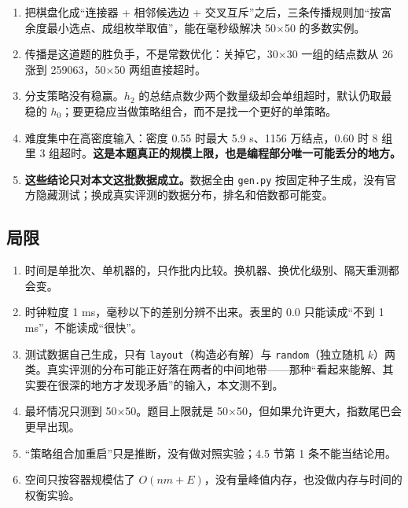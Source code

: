 \documentclass[12pt,a4paper,fontset=windows]{ctexart}
\newcommand{\code}[1]{\texttt{#1}}
\begin{document}
\begin{enumerate}[itemsep=3pt,topsep=2pt]
  \item 把棋盘化成“连接器 + 相邻候选边 + 交叉互斥”之后，三条传播规则加“按富余度最小选点、成组枚举取值”，能在毫秒级解决 50×50 的多数实例。
  \item 传播是这道题的胜负手，不是常数优化：关掉它，30×30 一组的结点数从 26 涨到 259063，50×50 两组直接超时。
  \item 分支策略没有稳赢。$h_2$ 的总结点数少两个数量级却会单组超时，默认仍取最稳的 $h_0$；要更稳应当做策略组合，而不是找一个更好的单策略。
  \item 难度集中在高密度输入：密度 0.55 时最大 5.9 s、1156 万结点，0.60 时 8 组里 3 组超时。\textbf{这是本题真正的规模上限，也是编程部分唯一可能丢分的地方。}
  \item \textbf{这些结论只对本文这批数据成立。}数据全由 \code{gen.py} 按固定种子生成，没有官方隐藏测试；换成真实评测的数据分布，排名和倍数都可能变。
\end{enumerate}

\subsection{局限}

\begin{enumerate}[itemsep=3pt,topsep=2pt]
  \item 时间是单批次、单机器的，只作批内比较。换机器、换优化级别、隔天重测都会变。
  \item 时钟粒度 1 ms，毫秒以下的差别分辨不出来。表里的 0.0 只能读成“不到 1 ms”，不能读成“很快”。
  \item 测试数据自己生成，只有 \code{layout}（构造必有解）与 \code{random}（独立随机 $k$）两类。真实评测的分布可能正好落在两者的中间地带——那种“看起来能解、其实要在很深的地方才发现矛盾”的输入，本文测不到。
  \item 最坏情况只测到 50×50。题目上限就是 50×50，但如果允许更大，指数尾巴会更早出现。
  \item “策略组合加重启”只是推断，没有做对照实验；4.5 节第 1 条不能当结论用。
  \item 空间只按容器规模估了 $O(nm+E)$，没有量峰值内存，也没做内存与时间的权衡实验。
\end{enumerate}

\end{document}
